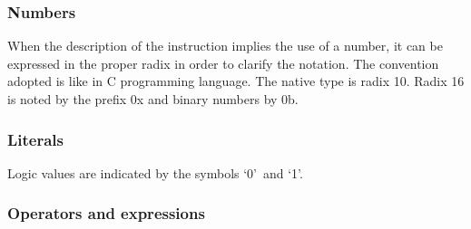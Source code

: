\subsubsection{Numbers}
\label{sssec:isa_numbers}
When the description of the instruction implies the use of a number, it can be expressed in the proper radix
in order to clarify the notation. The convention adopted is like in C programming language. The native type
is radix 10. Radix 16 is noted by the prefix 0x and binary numbers by 0b.

\subsubsection{Literals}
\label{sssec:isa_literals}
Logic values are indicated by the symbols `0'\ and `1'.

\subsubsection{Operators and expressions}
\label{sssec:isa_operators_expressions}
